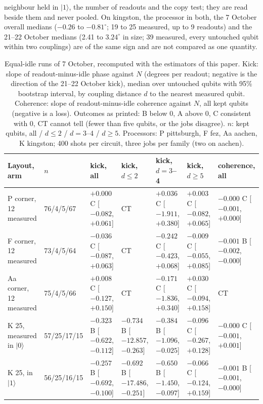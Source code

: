 \documentclass[reprint,amsmath,amssymb,aps,superscriptaddress,nofootinbib]{revtex4-2}
\begin{document}
neighbour held in $|1\rangle$, the number of readouts and the copy test; they are read beside them and never pooled. On kingston, the processor in both, the 7 October overall medians ($-0.26$ to $-0.81^\circ$; 19 to 25 measured, up to 9 readouts) and the 21--22 October medians (2.41 to $3.24^\circ$ in size; 39 measured, every untouched qubit within two couplings) are of the same sign and are not compared as one quantity.

\begin{table}[!tp]
\caption{Equal-idle runs of 7 October, recomputed with the estimators of this paper. Kick: slope of readout-minus-idle phase against $N$ (degrees per readout; negative is the direction of the 21--22 October kick), median over untouched qubits with 95\% bootstrap interval, by coupling distance $d$ to the nearest measured qubit. Coherence: slope of readout-minus-idle coherence against $N$, all kept qubits (negative is a loss). Outcomes as printed: B below 0, A above 0, C consistent with 0, CT cannot tell (fewer than five qubits, or the jobs disagree). $n$: kept qubits, all / $d\le2$ / $d=3$--4 / $d\ge5$. Processors: P pittsburgh, F fez, Aa aachen, K kingston; 400 shots per circuit, three jobs per family (two on aachen).}
\label{tab:oct07}
\scriptsize
\begin{tabular}{p{3.6cm}p{1.6cm}p{2.15cm}p{2.15cm}p{2.15cm}p{2.15cm}p{2.15cm}}
\toprule
Layout, arm & $n$ & kick, all & kick, $d\le2$ & kick, $d=3$--4 & kick, $d\ge5$ & coherence, all \\
\midrule
P corner, 12 measured & 76/4/5/67 & $+0.000$ C [$-0.082$,$+0.061$] & CT & $+0.036$ C [$-1.911$,$+0.380$] & $+0.003$ C [$-0.082$,$+0.065$] & $-0.000$ C [$-0.001$,$+0.000$] \\
F corner, 12 measured & 73/4/5/64 & $-0.036$ C [$-0.087$,$+0.063$] & CT & $-0.242$ C [$-0.423$,$+0.068$] & $-0.009$ C [$-0.055$,$+0.085$] & $-0.001$ B [$-0.002$,$-0.000$] \\
Aa corner, 12 measured & 75/4/5/66 & $+0.008$ C [$-0.127$,$+0.150$] & CT & $-0.171$ C [$-1.836$,$+0.340$] & $+0.030$ C [$-0.094$,$+0.158$] & CT \\
K 25, measured in $|0\rangle$ & 57/25/17/15 & $-0.323$ B [$-0.622$,$-0.112$] & $-0.734$ B [$-12.857$,$-0.263$] & $-0.384$ B [$-1.096$,$-0.025$] & $-0.096$ C [$-0.267$,$+0.128$] & $-0.000$ C [$-0.001$,$+0.001$] \\
K 25, in $|1\rangle$ & 56/25/16/15 & $-0.257$ B [$-0.692$,$-0.100$] & $-0.692$ B [$-17.486$,$-0.251$] & $-0.650$ B [$-1.450$,$-0.097$] & $-0.066$ C [$-0.124$,$+0.159$] & $-0.001$ B [$-0.001$,$-0.000$] \\

\end{tabular}
\end{table}
\end{document}
